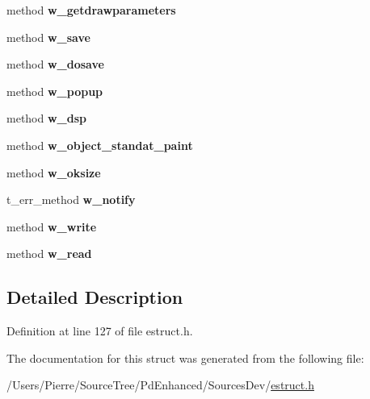 \begin{DoxyCompactItemize}
\item 
\hypertarget{struct__ewidget_a5eb6013a425a581ee41c734f44eb5255}{method {\bfseries w\-\_\-getdrawparameters}}\label{struct__ewidget_a5eb6013a425a581ee41c734f44eb5255}

\item 
\hypertarget{struct__ewidget_a18f2be4123b21b24c9f2673d22eea9fb}{method {\bfseries w\-\_\-save}}\label{struct__ewidget_a18f2be4123b21b24c9f2673d22eea9fb}

\item 
\hypertarget{struct__ewidget_aed0f8446884595a1091cae24873ddc39}{method {\bfseries w\-\_\-dosave}}\label{struct__ewidget_aed0f8446884595a1091cae24873ddc39}

\item 
\hypertarget{struct__ewidget_ad375827ec0dc5f2c712ba6f51608a44a}{method {\bfseries w\-\_\-popup}}\label{struct__ewidget_ad375827ec0dc5f2c712ba6f51608a44a}

\item 
\hypertarget{struct__ewidget_a6a3bf35bdca1508f50b885654b8fa8a1}{method {\bfseries w\-\_\-dsp}}\label{struct__ewidget_a6a3bf35bdca1508f50b885654b8fa8a1}

\item 
\hypertarget{struct__ewidget_a96ed05177c8899ca783c09f55229fc36}{method {\bfseries w\-\_\-object\-\_\-standat\-\_\-paint}}\label{struct__ewidget_a96ed05177c8899ca783c09f55229fc36}

\item 
\hypertarget{struct__ewidget_aef2440efc520270b766899eac0c50eaa}{method {\bfseries w\-\_\-oksize}}\label{struct__ewidget_aef2440efc520270b766899eac0c50eaa}

\item 
\hypertarget{struct__ewidget_ad60d080025f2fca515c7346761c0ded7}{t\-\_\-err\-\_\-method {\bfseries w\-\_\-notify}}\label{struct__ewidget_ad60d080025f2fca515c7346761c0ded7}

\item 
\hypertarget{struct__ewidget_a41f7c60b430e128c02fb13ffc5c9199d}{method {\bfseries w\-\_\-write}}\label{struct__ewidget_a41f7c60b430e128c02fb13ffc5c9199d}

\item 
\hypertarget{struct__ewidget_a08b27e9cb459b88a9418c61ac25e75df}{method {\bfseries w\-\_\-read}}\label{struct__ewidget_a08b27e9cb459b88a9418c61ac25e75df}

\end{DoxyCompactItemize}


\subsection{Detailed Description}


Definition at line 127 of file estruct.\-h.



The documentation for this struct was generated from the following file\-:\begin{DoxyCompactItemize}
\item 
/\-Users/\-Pierre/\-Source\-Tree/\-Pd\-Enhanced/\-Sources\-Dev/\hyperlink{estruct_8h}{estruct.\-h}\end{DoxyCompactItemize}
